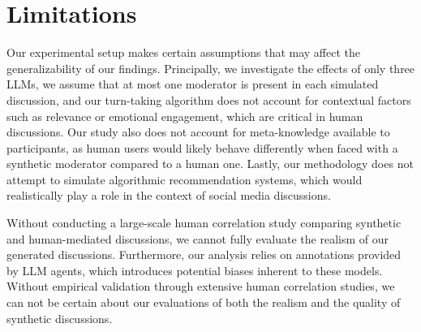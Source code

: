 %
\section{Limitations} 

Our experimental setup makes certain assumptions that may affect the generalizability of our findings. Principally, we investigate the effects of only three \acp{LLM}, we assume that at most one moderator is present in each simulated discussion, and our turn-taking algorithm does not account for contextual factors such as relevance or emotional engagement, which are critical in human discussions. Our study also does not account for meta-knowledge available to participants, as human users would likely behave differently when faced with a synthetic moderator compared to a human one. Lastly, our methodology does not attempt to simulate algorithmic recommendation systems, which would realistically play a role in the context of social media discussions.

Without conducting a large-scale human correlation study comparing synthetic and human-mediated discussions, we cannot fully evaluate the realism of our generated discussions. Furthermore, our analysis relies on annotations provided by \ac{LLM} agents, which introduces potential biases inherent to these models. Without empirical validation through extensive human correlation studies, we can not be certain about our evaluations of both the realism and the quality of synthetic discussions.